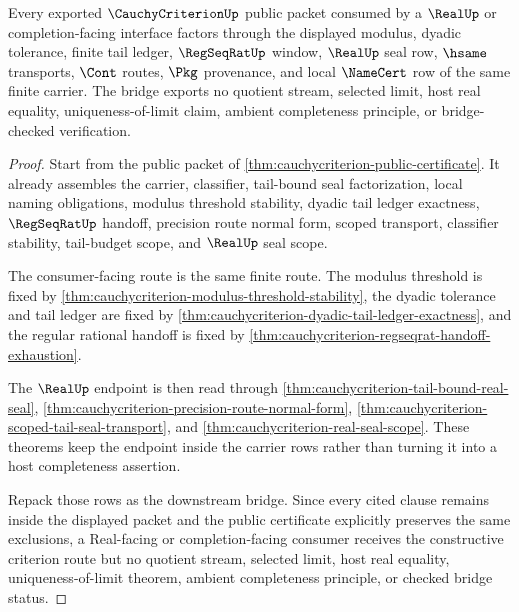\begin{theorem}
\label{thm:cauchycriterion-real-completion-consumer-bridge}
Every exported $\CauchyCriterionUp$ public packet consumed by a $\RealUp$ or completion-facing interface factors through the displayed modulus, dyadic tolerance, finite tail ledger, $\RegSeqRatUp$ window, $\RealUp$ seal row, $\hsame$ transports, $\Cont$ routes, $\Pkg$ provenance, and local $\NameCert$ row of the same finite carrier. The bridge exports no quotient stream, selected limit, host real equality, uniqueness-of-limit claim, ambient completeness principle, or bridge-checked verification.
\end{theorem}
\begin{proof}
Start from the public packet of \autoref{thm:cauchycriterion-public-certificate}. It already assembles the carrier, classifier, tail-bound seal factorization, local naming obligations, modulus threshold stability, dyadic tail ledger exactness, $\RegSeqRatUp$ handoff, precision route normal form, scoped transport, classifier stability, tail-budget scope, and $\RealUp$ seal scope.

The consumer-facing route is the same finite route. The modulus threshold is fixed by \autoref{thm:cauchycriterion-modulus-threshold-stability}, the dyadic tolerance and tail ledger are fixed by \autoref{thm:cauchycriterion-dyadic-tail-ledger-exactness}, and the regular rational handoff is fixed by \autoref{thm:cauchycriterion-regseqrat-handoff-exhaustion}.

The $\RealUp$ endpoint is then read through \autoref{thm:cauchycriterion-tail-bound-real-seal}, \autoref{thm:cauchycriterion-precision-route-normal-form}, \autoref{thm:cauchycriterion-scoped-tail-seal-transport}, and \autoref{thm:cauchycriterion-real-seal-scope}. These theorems keep the endpoint inside the carrier rows rather than turning it into a host completeness assertion.

Repack those rows as the downstream bridge. Since every cited clause remains inside the displayed packet and the public certificate explicitly preserves the same exclusions, a Real-facing or completion-facing consumer receives the constructive criterion route but no quotient stream, selected limit, host real equality, uniqueness-of-limit theorem, ambient completeness principle, or checked bridge status.
\end{proof}

